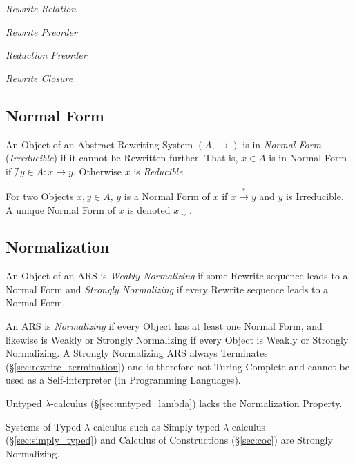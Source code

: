 \emph{Rewrite Relation}

\emph{Rewrite Preorder}

\emph{Reduction Preorder}

\emph{Rewrite Closure}



\subsection{Normal Form}\label{sec:normal_form}

An Object of an Abstract Rewriting System $(A,\rightarrow)$ is in
\emph{Normal Form} (\emph{Irreducible}) if it cannot be Rewritten
further. That is, $x \in A$ is in Normal Form if $\nexists y \in A : x
\rightarrow y$. Otherwise $x$ is \emph{Reducible}.

For two Objects $x,y \in A$, $y$ is a Normal Form of $x$ if $x
\stackrel{*}{\rightarrow} y$ and $y$ is Irreducible. A unique Normal
Form of $x$ is denoted $x \downarrow$.



\subsection{Normalization}\label{sec:normalization}

An Object of an ARS is \emph{Weakly Normalizing} if some Rewrite
sequence leads to a Normal Form and \emph{Strongly Normalizing} if
every Rewrite sequence leads to a Normal Form.

An ARS is \emph{Normalizing} if every Object has at least one Normal
Form, and likewise is Weakly or Strongly Normalizing if every Object
is Weakly or Strongly Normalizing. A Strongly Normalizing ARS always
Terminates (\S\ref{sec:rewrite_termination}) and is therefore not Turing
Complete and cannot be used as a Self-interpreter (in Programming
Languages).

Untyped $\lambda$-calculus (\S\ref{sec:untyped_lambda}) lacks the
Normalization Property.

Systems of Typed $\lambda$-calculus such as Simply-typed
$\lambda$-calculus (\S\ref{sec:simply_typed}) and Calculus of
Constructions (\S\ref{sec:coc}) are Strongly Normalizing.


